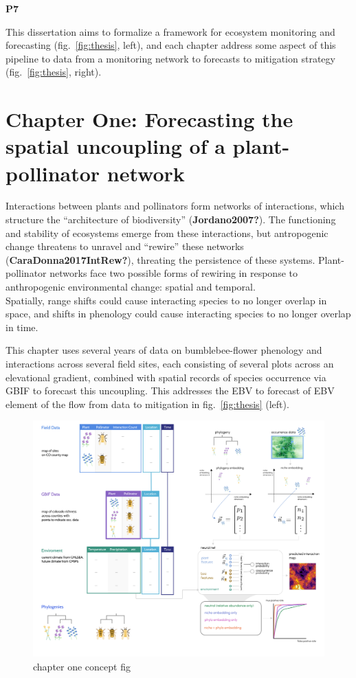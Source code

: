 \documentclass[10pt,oneside]{article}
\makeatletter
\def\maxwidth{\ifdim\Gin@nat@width>\linewidth\linewidth
\else\Gin@nat@width\fi}
\let\Oldincludegraphics\includegraphics
\renewcommand{\includegraphics}[1]{\Oldincludegraphics[width=\maxwidth]{#1}}
\makeatother
\begin{document}
\textbf{P7}

This dissertation aims to formalize a framework for ecosystem monitoring
and forecasting (fig.~\ref{fig:thesis}, left), and each chapter address
some aspect of this pipeline to data from a monitoring network to
forecasts to mitigation strategy (fig.~\ref{fig:thesis}, right).

\hypertarget{chapter-one-forecasting-the-spatial-uncoupling-of-a-plant-pollinator-network}{%
\section{Chapter One: Forecasting the spatial uncoupling of a
plant-pollinator
network}\label{chapter-one-forecasting-the-spatial-uncoupling-of-a-plant-pollinator-network}}

Interactions between plants and pollinators form networks of
interactions, which structure the ``architecture of biodiversity''
(\textbf{Jordano2007?}). The functioning and stability of ecosystems
emerge from these interactions, but antropogenic change threatens to
unravel and ``rewire'' these networks (\textbf{CaraDonna2017IntRew?}),
threating the persistence of these systems. Plant-pollinator networks
face two possible forms of rewiring in response to anthropogenic
environmental change: spatial and temporal.\\
Spatially, range shifts could cause interacting species to no longer
overlap in space, and shifts in phenology could cause interacting
species to no longer overlap in time.

This chapter uses several years of data on bumblebee-flower phenology
and interactions across several field sites, each consisting of several
plots across an elevational gradient, combined with spatial records of
species occurrence via GBIF to forecast this uncoupling. This addresses
the EBV to forecast of EBV element of the flow from data to mitigation
in fig.~\ref{fig:thesis} (left).

\begin{figure}
\centering
\includegraphics{./figures/ch1.png}
\caption{chapter one concept fig}
\end{figure}
\end{document}
